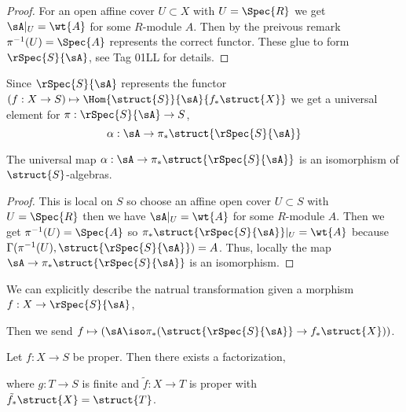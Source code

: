 \documentclass[12pt]{article}
\begin{document}
\begin{proof}
For an open affine cover $U \subset X$ with $U = \Spec{R}$ we get $\sA|_U = \wt{A}$ for some $R$-module $A$. Then by the preivous remark $\pi^{-1}(U) = \Spec{A}$ represents the correct functor. These glue to form $\rSpec{S}{\sA}$, see Tag 01LL for details.
\end{proof}

\begin{rmk}
Since $\rSpec{S}{\sA}$ represents the functor $(f : X \to S) \mapsto \Hom{\struct{S}}{\sA}{f_* \struct{X}}$ we get a universal element for $\pi : \rSpec{S}{\sA} \to S$,
\[ \alpha : \sA \to \pi_* \struct{\rSpec{S}{\sA}} \]
\end{rmk}

\begin{prop}
The universal map $\alpha : \sA \to \pi_* \struct{\rSpec{S}{\sA}}$ is an isomorphism of $\struct{S}$-algebras.
\end{prop}

\begin{proof}
This is local on $S$ so choose an affine open cover $U \subset S$ with $U = \Spec{R}$ then we have $\sA|_U = \wt{A}$ for some $R$-module $A$. Then we get $\pi^{-1}(U) = \Spec{A}$ so $\pi_* \struct{\rSpec{S}{\sA}} |_U = \wt{A}$ because $\Gamma(\pi^{-1}(U), \struct{\rSpec{S}{\sA}}) = A$. Thus, locally the map $\sA \to \pi_* \struct{\rSpec{S}{\sA}}$ is an isomorphism.
\end{proof}

\begin{rmk}
We can explicitly describe the natrual transformation given a morphism $f : X \to \rSpec{S}{\sA}$,
\begin{center}
\end{center}
Then we send $f \mapsto (\sA \iso \pi_* (\struct{\rSpec{S}{\sA}} \to f_* \struct{X}))$. 
\end{rmk}

\begin{theorem}
Let $f : X \to S$ be proper. Then there exists a factorization,
\begin{center}
\end{center}
where $g : T \to S$ is finite and $\tilde{f} : X \to T$ is proper with $\tilde{f}_* \struct{X} = \struct{T}$.
\end{theorem}
\end{document}
